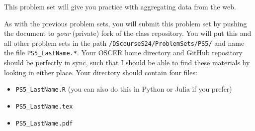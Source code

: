 \documentclass[12pt,english]{exam}
\begin{document}
This problem set will give you practice with aggregating data from the web.

As with the previous problem sets, you will submit this problem set by pushing the document to \emph{your} (private) fork of the class repository. You will put this and all other problem sets in the path \texttt{/DScourseS24/ProblemSets/PS5/} and name the file \texttt{PS5\_LastName.*}. Your OSCER home directory and GitHub repository should be perfectly in sync, such that I should be able to find these materials by looking in either place. Your directory should contain four files:
\begin{itemize}
    \item \texttt{PS5\_LastName.R} (you can also do this in Python or Julia if you prefer)
    \item \texttt{PS5\_LastName.tex}
    \item \texttt{PS5\_LastName.pdf}
\end{itemize}
\end{document}

